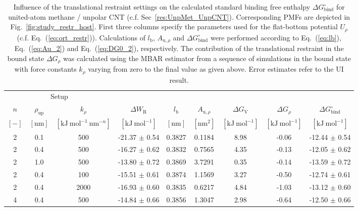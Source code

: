 \documentclass[9pt,lessons]{livecoms}
\begin{document}
\begin{table}[ht]
\caption{\label{tbl:1Dsetup}
Influence of the translational restraint settings on the calculated standard binding free enthalpy $\Delta G^\circ_\mathrm{bind}$ for united-atom methane / unpolar CNT (c.f. Sec~\ref{res:UnpMet_UnpCNT}).
Corresponding PMFs are depicted in Fig.~\ref{fig:study_restr_host}. 
First three columns specify the parameters used for the flat-bottom potential $U_\rho$ (c.f. Eq.~(\ref{eq:ort_restr})). 
Calculations of $l_\mathrm{b}$, $A_{\mathrm{u},\rho}$ and $\Delta G^\circ_\mathrm{bind}$ were performed according to Eq.~(\ref{eq:lb}), Eq.~(\ref{eq:Au_2}) and Eq.~(\ref{eq:DG0_2}), respectively. 
The contribution of the translational restraint in the bound state $\Delta G_\rho$ was calculated using the MBAR estimator from a sequence of simulations in the bound state with force constants $k_\rho$ varying from zero to the final value as given above. Error estimates refer to the UI result.
}
\centering
\begin{tabular}{ccc ccc ccc}\hline
\multicolumn{3}{c}{Setup} &  \\
\cline{1-3} 
$n$ & $\rho_\mathrm{up}$ & $k_\rho$  & $\Delta W_\mathrm{R}$  & $l_\mathrm{b}$ & $A_{\mathrm{u},\rho}$ & $\Delta G_\mathrm{V}$ & 
$\Delta G_\rho$ & $\Delta G^\circ_\mathrm{bind}$ \\
$[-]$ & $[\mathrm{nm}]$ & $[\mathrm{kJ~mol}^{-1}~\mathrm{nm}^{-n}]$ & $[\mathrm{kJ~mol}^{-1}]$ & $[\mathrm{nm}]$ & $[\mathrm{nm}^2]$ & $[\mathrm{kJ~mol}^{-1}]$ & $[\mathrm{kJ~mol}^{-1}]$ & 
$[\mathrm{kJ~mol}^{-1}]$ \\ 
\hline
2 & 0.1 & 500  &  -21.37 $\pm$ 0.54 & 0.3827 &  0.1184 &  8.98  & -0.06 &  -12.44 $\pm$  0.54 \\   
2 & 0.4 & 500  &  -16.27 $\pm$ 0.62 & 0.3832 &  0.7565 &  4.35  & -0.13 &  -12.05 $\pm$  0.62\\
2 & 1.0 & 500  &  -13.80 $\pm$ 0.72 & 0.3869 &  3.7291 &  0.35  &  -0.14  &  -13.59 $\pm$ 0.72\\
2 & 0.4 & 100  &  -15.51 $\pm$ 0.61 & 0.3874 &  1.1569 &  3.27  &  -0.50 &  -12.74 $\pm$ 0.61\\
2 & 0.4 & 2000 & -16.93 $\pm$ 0.60 & 0.3835 &  0.6217 &  4.84  &  -1.03  &  -13.12 $\pm$ 0.60\\
4 & 0.4 & 500  &  -14.84 $\pm$ 0.66 & 0.3856 &  1.3047 &  2.98  &  -0.64 &  -12.50 $\pm$ 0.66\\ 
\hline
\end{tabular}
\end{table}
\end{document}
